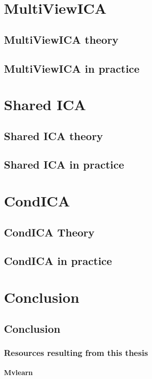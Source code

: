 \documentclass[ twoside,openright,titlepage,numbers=noenddot,%
                headinclude,footinclude,cleardoublepage=empty,abstract=on,
                BCOR=5mm,paper=a4,fontsize=11pt, 
                ]{scrreprt}
\begin{document}
\part{MultiViewICA}
\chapter{MultiViewICA theory}
\label{ch:mvica1}

\chapter{MultiViewICA in practice}
\label{ch:mvica2}

\part{Shared ICA}
\chapter{Shared ICA theory}
\label{ch:shica}

\chapter{Shared ICA in practice}
\label{ch:shica2}

\part{CondICA}
\chapter{CondICA Theory}
\label{ch:condica}

\chapter{CondICA in practice}
\label{ch:condica2}


\part{Conclusion}
\chapter{Conclusion}
\section{Resources resulting from this thesis}
\subsection{Mvlearn}
\end{document}
